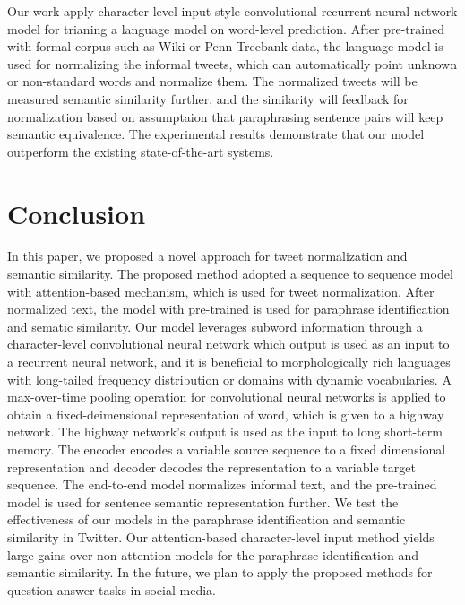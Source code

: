 \documentclass[letterpaper]{article}
\begin{document}
Our work apply character-level input style convolutional recurrent neural network model for trianing a language model on word-level prediction. After pre-trained with formal corpus such as Wiki or Penn Treebank data, the language model is used for normalizing the informal tweets, which can automatically point unknown or non-standard words and normalize them. The normalized tweets will be measured semantic similarity further, and the similarity will feedback for normalization based on assumptaion that paraphrasing sentence pairs will keep semantic equivalence. The experimental results demonstrate that our model outperform the existing state-of-the-art systems.

\section{Conclusion}
In this paper, we proposed a novel approach for tweet normalization and semantic similarity. The proposed method adopted a sequence to sequence model with attention-based mechanism, which is used for tweet normalization. After normalized text, the model with pre-trained is used for paraphrase identification and sematic similarity. Our model leverages subword information through a character-level convolutional neural network which output is used as an input to a recurrent neural network, and it is beneficial to morphologically rich languages with long-tailed frequency distribution or domains with dynamic vocabularies. A max-over-time pooling operation for convolutional neural networks is applied to obtain a fixed-deimensional representation of word, which is given to a highway network. The highway network's output is used as the input to long short-term memory. The encoder encodes a variable source sequence to a fixed dimensional representation and decoder decodes the representation to a variable target sequence. The end-to-end model normalizes informal text, and the pre-trained model is used for sentence semantic representation further. We test the effectiveness of our models in the paraphrase identification and semantic similarity in Twitter. Our attention-based character-level input method yields large gains over non-attention models for the paraphrase identification and semantic similarity. In the future, we plan to apply the proposed methods for question answer tasks in social media.



\end{document}
